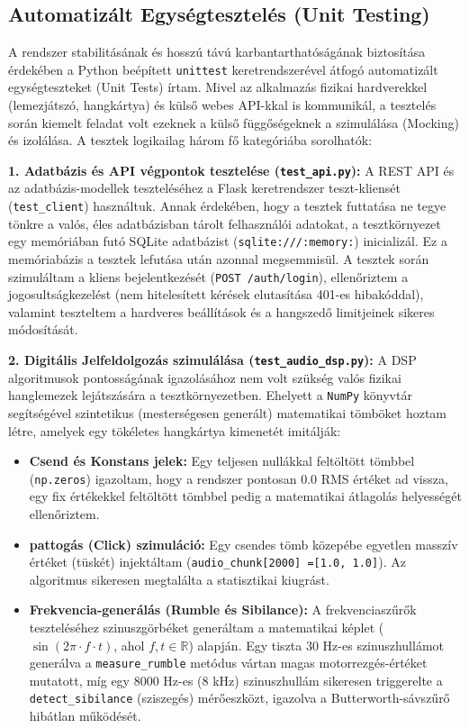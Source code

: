 \subsection{Automatizált Egységtesztelés (Unit Testing)}
A rendszer stabilitásának és hosszú távú karbantarthatóságának biztosítása érdekében a Python beépített \texttt{unittest} keretrendszerével átfogó automatizált egységteszteket (Unit Tests) írtam. Mivel az alkalmazás fizikai hardverekkel (lemezjátszó, hangkártya) és külső webes API-kkal is kommunikál, a tesztelés során kiemelt feladat volt ezeknek a külső függőségeknek a szimulálása (Mocking) és izolálása. A tesztek logikailag három fő kategóriába sorolhatók:

\textbf{1. Adatbázis és API végpontok tesztelése (\texttt{test\_api.py}):}
A REST API és az adatbázis-modellek teszteléséhez a Flask keretrendszer teszt-kliensét (\texttt{test\_client}) használtuk. Annak érdekében, hogy a tesztek futtatása ne tegye tönkre a valós, éles adatbázisban tárolt felhasználói adatokat, a tesztkörnyezet egy memóriában futó SQLite adatbázist (\texttt{sqlite:///:memory:}) inicializál. Ez a memóriabázis a tesztek lefutása után azonnal megsemmisül.
A tesztek során szimuláltam a kliens bejelentkezését (\texttt{POST /auth/login}), ellenőriztem a jogosultságkezelést (nem hitelesített kérések elutasítása 401-es hibakóddal), valamint teszteltem a hardveres beállítások és a hangszedő limitjeinek sikeres módosítását.

\textbf{2. Digitális Jelfeldolgozás szimulálása (\texttt{test\_audio\_dsp.py}):}
A DSP algoritmusok pontosságának igazolásához nem volt szükség valós fizikai hanglemezek lejátszására a tesztkörnyezetben. Ehelyett a \texttt{NumPy} könyvtár segítségével szintetikus (mesterségesen generált) matematikai tömböket hoztam létre, amelyek egy tökéletes hangkártya kimenetét imitálják:
\begin{itemize}
    \item \textbf{Csend és Konstans jelek:} Egy teljesen nullákkal feltöltött tömbbel (\texttt{np.zeros}) igazoltam, hogy a rendszer pontosan 0.0 RMS értéket ad vissza, egy fix értékekkel feltöltött tömbbel pedig a matematikai átlagolás helyességét ellenőriztem.
    \item \textbf{pattogás (Click) szimuláció:} Egy csendes tömb közepébe egyetlen masszív értéket (tüskét) injektáltam (\texttt{audio\_chunk[2000] =[1.0, 1.0]}). Az algoritmus sikeresen megtalálta a statisztikai kiugrást.
    \item \textbf{Frekvencia-generálás (Rumble és Sibilance):} A frekvenciaszűrők teszteléséhez szinuszgörbéket generáltam a matematikai képlet ($ \sin(2 \pi \cdot f \cdot t) $, ahol $f, t \in \mathbb{R}$) alapján. Egy tiszta 30 Hz-es szinuszhullámot generálva a \texttt{measure\_rumble} metódus vártan magas motorrezgés-értéket mutatott, míg egy 8000 Hz-es (8 kHz) szinuszhullám sikeresen triggerelte a \texttt{detect\_sibilance} (sziszegés) mérőeszközt, igazolva a Butterworth-sávszűrő hibátlan működését.
\end{itemize}

